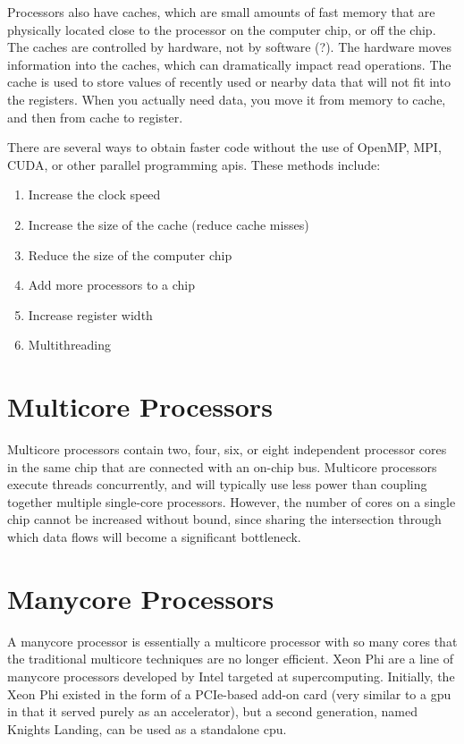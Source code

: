 \documentclass[10pt]{article}
\begin{document}
\begin{flushleft}
Processors also have caches, which are small amounts of fast memory that are physically located close to the processor on the computer chip, or off the chip. The caches are controlled by hardware, not by software (?). The hardware moves information into the caches, which can dramatically impact read operations. The cache is used to store values of recently used or nearby data that will not fit into the registers. When you actually need data, you move it from memory to cache, and then from cache to register. 

There are several ways to obtain faster code without the use of OpenMP, MPI, CUDA, or other parallel programming \gls{api}s. These methods include:

\begin{enumerate}
\item Increase the clock speed
\item Increase the size of the cache (reduce cache misses)
\item Reduce the size of the computer chip
\item Add more processors to a chip
\item Increase register width
\item Multithreading
\end{enumerate}

\section{Multicore Processors}
Multicore processors contain two, four, six, or eight independent processor cores in the same chip that are connected with an on-chip bus. Multicore processors execute threads concurrently, and will typically use less power than coupling together multiple single-core processors. However, the number of cores on a single chip cannot be increased without bound, since sharing the intersection through which data flows will become a significant bottleneck. 

\section{Manycore Processors}
A manycore processor is essentially a multicore processor with so many cores that the traditional multicore techniques are no longer efficient. Xeon Phi are a line of manycore processors developed by Intel targeted at supercomputing. Initially, the Xeon Phi existed in the form of a PCIe-based add-on card (very similar to a \gls{gpu} in that it served purely as an accelerator), but a second generation, named Knights Landing, can be used as a standalone \gls{cpu}. 


\end{flushleft}
\end{document}
